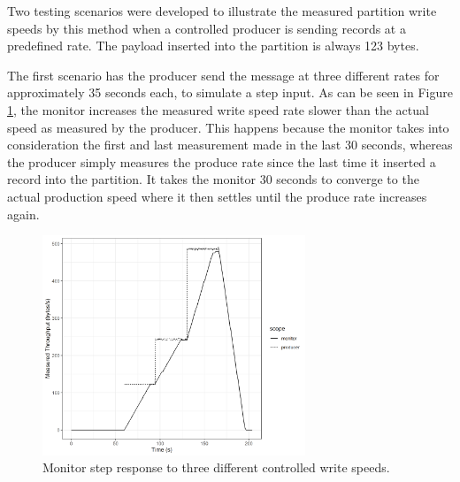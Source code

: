 Two testing scenarios were developed to illustrate the measured partition write
speeds by this method when a controlled producer is sending records at a
predefined rate. The payload inserted into the partition is always 123 bytes.

The first scenario has the producer send the message at three different rates for
approximately 35 seconds each, to simulate a step input. As can be seen in
Figure \ref{fig:monitor_step}, the monitor increases the measured write speed
rate slower than the actual speed as measured by the producer. This happens
because the monitor takes into consideration the first and last measurement made
in the last 30 seconds, whereas the producer simply measures the produce rate
since the last time it inserted a record into the partition. It takes the
monitor 30 seconds to converge to the actual production speed where it then
settles until the produce rate increases again.

\begin{figure}[htb!] 
    \centering
    \includegraphics[width=0.7\textwidth]{images/monitor/step.png}
    \caption{Monitor step response to three different controlled write speeds.}
    \label{fig:monitor_step} 
\end{figure}

